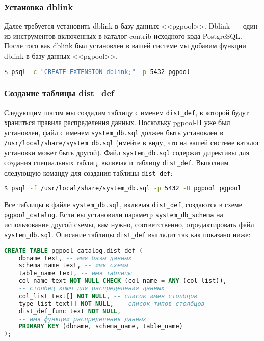 \subsubsection{Установка dblink}

Далее требуется установить dblink в базу данных <<pgpool>>. Dblink~--- один из инструментов включенных в каталог contrib исходного кода PostgreSQL. После того как dblink был установлен в вашей системе мы добавим функции dblink в базу данных <<pgpool>>.

\begin{lstlisting}[language=Bash,label=lst:pgpool29,caption=Установка dblink]
$ psql -c "CREATE EXTENSION dblink;" -p 5432 pgpool
\end{lstlisting}


\subsubsection{Создание таблицы dist\_def}

Следующим шагом мы создадим таблицу с именем \lstinline!dist_def!, в которой будут храниться правила распределения данных. Поскольку pgpool-II уже был установлен, файл с именем \lstinline!system_db.sql! должен быть установлен в \lstinline!/usr/local/share/system_db.sql! (имейте в виду, что на вашей системе каталог установки может быть другой). Файл \lstinline!system_db.sql! содержит директивы для создания специальных таблиц, включая и таблицу \lstinline!dist_def!. Выполним следующую команду для создания таблицы \lstinline!dist_def!:

\begin{lstlisting}[language=Bash,label=lst:pgpool30,caption=Создание таблицы dist\_def]
$ psql -f /usr/local/share/system_db.sql -p 5432 -U pgpool pgpool
\end{lstlisting}

Все таблицы в файле \lstinline!system_db.sql!, включая \lstinline!dist_def!, создаются в схеме \lstinline!pgpool_catalog!. Если вы установили параметр \lstinline!system_db_schema! на использование другой схемы, вам нужно, соответственно, отредактировать файл \lstinline!system_db.sql!. Описание таблицы \lstinline!dist_def! выглядит так как показано ниже:

\begin{lstlisting}[language=SQL,label=lst:pgpool31,caption=Создание таблицы dist\_def]
CREATE TABLE pgpool_catalog.dist_def (
    dbname text, -- имя базы данных
    schema_name text, -- имя схемы
    table_name text, -- имя таблицы
    col_name text NOT NULL CHECK (col_name = ANY (col_list)),
    -- столбец ключ для распределения данных
    col_list text[] NOT NULL, -- список имен столбцов
    type_list text[] NOT NULL, -- список типов столбцов
    dist_def_func text NOT NULL,
    -- имя функции распределения данных
    PRIMARY KEY (dbname, schema_name, table_name)
);
\end{lstlisting}

